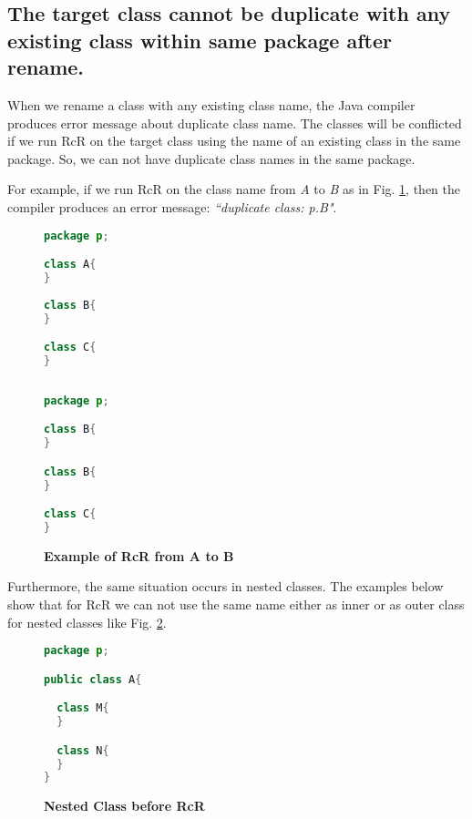 \subsection{The target class cannot be duplicate with any existing class within same package after rename.}

When we rename a class with any existing class name, the Java compiler produces error message about duplicate class name. The classes will be conflicted if we run RcR on the target class using the name of an existing class in the same package. So, we can not have duplicate class names in the same package. 

For example, if we run RcR on the class name from \textsl{A} to \textsl{B} as in Fig. \ref{fig:afterrr}, then the compiler produces an error message: \textit{``duplicate class: p.B"}.

\begin{figure}[th]
\centering
\begin{minipage}[t]{0.45\linewidth}
\begin{lstlisting}[language=java, basicstyle=\scriptsize\ttfamily,frame=single]
package p;

class A{
}
	
class B{
}

class C{
}
 
\end{lstlisting}
\end{minipage}
\hfill
\begin{minipage}[t]{0.45\linewidth}
\begin{lstlisting}[language=java, basicstyle=\scriptsize\ttfamily,frame=single]
package p;

class B{
}	

class B{
}

class C{
}

\end{lstlisting}
\end{minipage}
\caption{\textbf{Example of RcR from A to B}}
\label{fig:afterrr}
\end{figure}


Furthermore, the same situation occurs in nested classes. The examples below show that for RcR we can not use the same name either as inner or as outer class for nested classes like Fig. \ref{figure:nested}.

\begin{figure}[th]
\centering
\begin{minipage}[t]{0.5\linewidth}
\begin{lstlisting}[language=java, basicstyle=\scriptsize\ttfamily,frame=single]
package p;

public class A{	

  class M{
  }

  class N{
  }
} 
\end{lstlisting}
\end{minipage}
\caption{\textbf{Nested Class before RcR}}
\label{figure:nested}
\end{figure}


